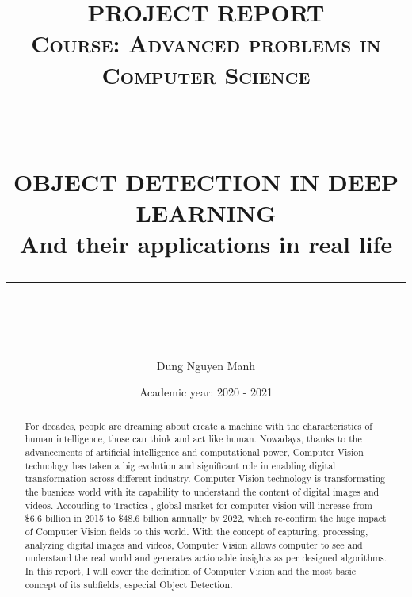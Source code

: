 \documentclass[12pt]{article}
\newcommand{\HRule}[1]{\rule{\linewidth}{#1}}
\begin{document}
\title{ \normalsize \textsc{PROJECT REPORT\\
    Course: Advanced problems in Computer Science}
\\ [5.0cm]
\HRule{0.5pt} \\
\LARGE \textbf{\uppercase{OBJECT DETECTION IN DEEP LEARNING}}
\\ [0.25 cm]
\large {And their applications in real life}
\HRule{2pt} \\ [0.5 cm]
\normalsize  \vspace*{5\baselineskip}}

\date{
    \large{Academic year: 2020 - 2021}
}

\author{
    Dung Nguyen Manh \\
}

\newpage
\maketitle

\sectionfont{\scshape}

\newpage
\tableofcontents
\newpage


\begin{abstract}
For decades, people are dreaming about create a machine with the characteristics
of human intelligence, those can think and act like human. Nowadays, thanks to the
advancements of artificial intelligence and computational power, Computer Vision
technology has taken a big evolution and significant role in enabling digital
transformation across different industry. Computer Vision technology is
transformating the busniess world with its capability to understand the content
of digital images and videos. Accouding to Tractica \cite{tracitareport}, global
market for computer vision will increase from \$6.6 billion in 2015 to \$48.6
billion annually by 2022, which re-confirm the huge impact of Computer Vision fields
to this world. With the concept of capturing, processing, analyzing digital images
and videos, Computer Vision allows computer to see and understand the real world and
generates actionable insights as per designed algorithms. In this report, I will cover
the definition of Computer Vision and the most basic concept of its subfields,
especial Object Detection.
\end{abstract}
\end{document}
